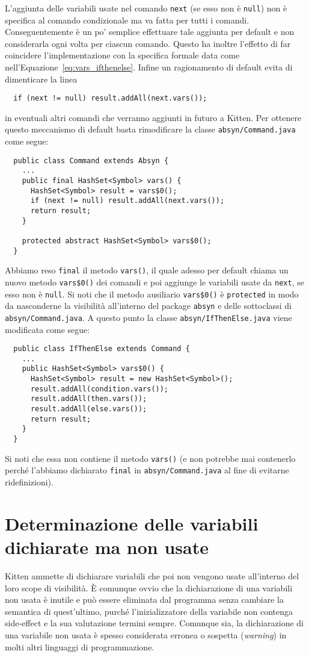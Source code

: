 L'aggiunta delle variabili usate nel comando \texttt{next} (se esso non \`e
\texttt{null}) non
\`e specifica al comando condizionale ma va fatta per tutti i comandi.
Conseguentemente \`e un po' \piu semplice effettuare tale aggiunta per
default e non considerarla ogni volta per ciascun comando. Questo ha inoltre
l'effetto di far coincidere l'implementazione con la specifica
formale data come nell'Equazione~\eqref{eq:vars_ifthenelse}.
Infine un ragionamento di default evita di dimenticare la linea
\begin{verbatim}
  if (next != null) result.addAll(next.vars());
\end{verbatim}
in eventuali altri comandi che verranno aggiunti in futuro a Kitten.
Per ottenere questo meccanismo di default basta
rimodificare la classe \texttt{absyn/Command.java} come segue:
%
\begin{verbatim}
  public class Command extends Absyn {
    ...
    public final HashSet<Symbol> vars() {
      HashSet<Symbol> result = vars$0();
      if (next != null) result.addAll(next.vars());
      return result;
    }

    protected abstract HashSet<Symbol> vars$0();
  }
\end{verbatim}
%
Abbiamo \cioe reso \texttt{final} il metodo \texttt{vars()}, il quale adesso
per default chiama un nuovo metodo \texttt{vars\$0()} dei comandi e poi
aggiunge le variabili usate da \texttt{next}, se esso non \`e \texttt{null}.
Si noti che
il metodo ausiliario \texttt{vars\$0()} \`e \texttt{protected} in modo
da nasconderne la visibilit\`a all'interno del package \texttt{absyn} e delle
sottoclassi di \texttt{absyn/Command.java}. A questo punto la classe
\texttt{absyn/IfThenElse.java} viene modificata come segue:
%
\begin{verbatim}
  public class IfThenElse extends Command {
    ...
    public HashSet<Symbol> vars$0() {
      HashSet<Symbol> result = new HashSet<Symbol>();
      result.addAll(condition.vars());
      result.addAll(then.vars());
      result.addAll(else.vars());
      return result;
    }
  }
\end{verbatim}
Si noti che essa non contiene \piu il metodo \texttt{vars()} (e non potrebbe
mai contenerlo perch\'e l'abbiamo dichiarato \texttt{final} in
\texttt{absyn/Command.java} al fine di evitarne ridefinizioni).
%
\section{Determinazione delle variabili dichiarate ma non usate}
  \label{sec:no_use}
%
Kitten ammette di dichiarare variabili che poi non vengono usate all'interno
del loro scope di visibilit\`a. \`E comunque ovvio che la dichiarazione di
una variabili non usata \`e inutile e pu\`o essere eliminata dal programma
senza cambiare la semantica di quest'ultimo,
purch\'e l'inizializzatore della variabile non
contenga side-effect e la sua valutazione termini sempre.
Comunque sia, la dichiarazione
di una variabile non usata \`e spesso considerata erronea o sospetta
(\emph{warning}) in molti altri linguaggi di programmazione.

